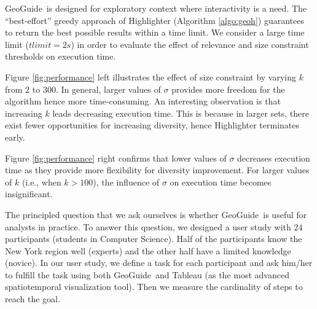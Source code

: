\documentclass{vldb}
\newcommand{\framework}{{\sc GeoGuide}}
\begin{document}


 \framework\ is designed for exploratory context where interactivity is a need. The ``best-effort'' greedy approach of {\sc Highlighter} (Algorithm \ref{algo:geoh}) guarantees to return the best possible results within a time limit. We consider a large time limit ($tlimit = 2s$) in order to evaluate the effect of relevance and size constraint thresholds on execution time.

Figure \ref{fig:performance} left illustrates the effect of size constraint by varying $k$ from $2$ to $300$. In general, larger values of $\sigma$ provides more freedom for the algorithm hence more time-consuming. An interesting observation is that increasing $k$ leads decreasing execution time. This is because in larger sets, there exist fewer opportunities for increasing diversity, hence {\sc Highlighter} terminates early.

Figure \ref{fig:performance} right confirms that lower values of $\sigma$ decreases execution time as they provide more flexibility for diversity improvement. For larger values of $k$ (i.e., when $k >100$), the influence of $\sigma$ on execution time becomes insignificant.

\vspace{5pt}
The principled question that we ask ourselves is whether \framework\ is useful for analysts in practice. To answer this question, we designed a user study with $24$ participants (students in Computer Science). Half of the participants know the New York region well (experts) and the other half have a limited knowledge (novice). In our user study, we define a task for each participant and ask him/her to fulfill the task using both \framework\ and {\sc Tableau} (as the most advanced spatiotemporal visualization tool). Then we measure the cardinality of steps to reach the goal.
\end{document}
